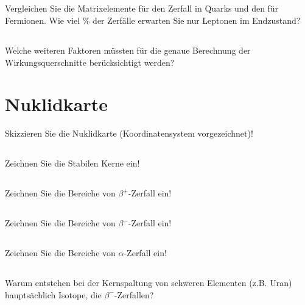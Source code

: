 \subsection{} Vergleichen Sie die Matrixelemente für den Zerfall in Quarks und den für Fermionen. Wie viel \% der Zerfälle erwarten Sie nur Leptonen im Endzustand?
\subsection{} Welche weiteren Faktoren müssten für die genaue Berechnung der Wirkungsquerschnitte berücksichtigt werden?

\section{Nuklidkarte}
Skizzieren Sie die Nuklidkarte (Koordinatensystem vorgezeichnet)!
\subsection{} Zeichnen Sie die Stabilen Kerne ein!
\subsection{} Zeichnen Sie die Bereiche von $\beta^+$-Zerfall ein!
\subsection{} Zeichnen Sie die Bereiche von $\beta^-$-Zerfall ein!
\subsection{} Zeichnen Sie die Bereiche von $\alpha$-Zerfall ein!
\subsection{} Warum entstehen bei der Kernspaltung von schweren Elementen (z.B. Uran) hauptsächlich Isotope, die $\beta^-$-Zerfallen?

 